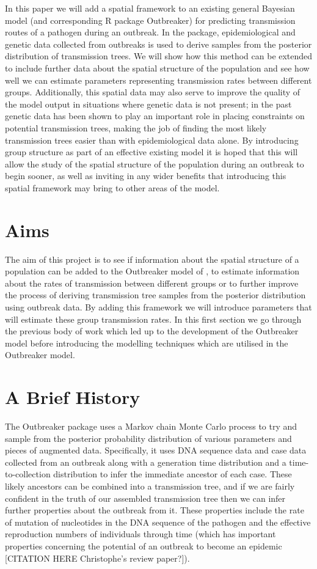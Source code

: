 \documentclass[11pt,a4paper]{report}
\begin{document}
In this paper we will add a spatial framework to an existing general Bayesian model (and corresponding R package Outbreaker) for predicting transmission routes of a pathogen during an outbreak. In the package, epidemiological and genetic data collected from outbreaks is used to derive samples from the posterior distribution of transmission trees. We will show how this method can be extended to include further data about the spatial structure of the population and see how well we can estimate parameters representing transmission rates between different groups. Additionally, this spatial data may also serve to improve the quality of the model output in situations where genetic data is not present; in the past genetic data has been shown to play an important role in placing constraints on potential transmission trees, making the job of finding the most likely transmission trees easier than with epidemiological data alone. By introducing group structure as part of an effective existing model it is hoped that this will allow the study of the spatial structure of the population during an outbreak to begin sooner, as well as inviting in any wider benefits that introducing this spatial framework may bring to other areas of the model.
\section{Aims}
The aim of this project is to see if information about the spatial structure of a population can be added to the Outbreaker model of \citet{outbrkr}, to estimate information about the rates of transmission between different groups or to further improve the process of deriving transmission tree samples from the posterior distribution using outbreak data. By adding this framework we will introduce parameters that will estimate these group transmission rates. In this first section we go through the previous body of work which led up to the development of the Outbreaker model before introducing the modelling techniques which are utilised in the Outbreaker model.


\section{A Brief History}
The Outbreaker package uses a Markov chain Monte Carlo process to try and sample from the posterior probability distribution of various parameters and pieces of augmented data. Specifically, it uses DNA sequence data and case data collected from an outbreak along with a generation time distribution and a time-to-collection distribution to infer the immediate ancestor of each case. These likely ancestors can be combined into a transmission tree, and if we are fairly confident in the truth of our assembled transmission tree then we can infer further properties about the outbreak from it. These properties include the rate of mutation of nucleotides in the DNA sequence of the pathogen and the effective reproduction numbers of individuals through time (which has important properties concerning the potential of an outbreak to become an epidemic [CITATION HERE Christophe's review paper?]).
\end{document}
